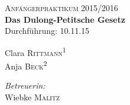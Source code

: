 \begin{titlepage}
\ \\
[1cm]
	\par
	\hfill
	\par
\begin{center}
\ \\
[5cm]	
	\textsc{\Huge Anfängerpraktikum 2015/2016} \\
[2cm]
	\textbf{\Huge Das Dulong-Petitsche Gesetz} \\
[1cm]
	{\large Durchführung: 10.11.15} \\
[4cm]
\begin{minipage}{0.4\textwidth}
	\begin{flushleft} \large
		Clara \textsc{Rittmann}\textsuperscript{1} \\
		Anja \textsc{Beck}\textsuperscript{2}
	\end{flushleft}
\end{minipage}
\hfill
\begin{minipage}{0.4\textwidth}
	\begin{flushright} \large
		\emph{Betreuerin:} \\
		Wiebke \textsc{Malitz}
	\end{flushright}
\end{minipage}
\end{center}
\end{titlepage}